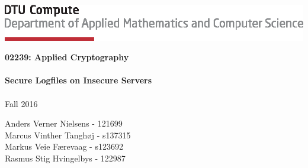 \begin{titlepage}
\null
\vfill
\includegraphics[scale=1]{img/tex_dtu_compute_a_uk}\\[20pt]
\addtolength{\wpXoffset}{-6cm}
\addtolength{\wpYoffset}{-10cm}

{\huge\bfseries 02239: Applied Cryptography}\\\ \\
{\LARGE\bfseries Secure Logfiles on Insecure Servers}\\\ \\
{Fall 2016}

\vspace{140pt}

Anders Verner Nielsens - 121699\\
Marcus Vinther Tanghøj - s137315\\
Markus Veie Færevaag - s123692\\
Rasmus Stig Hvingelbys - 122987 \\
\\
[7cm]
\end{titlepage}

\newpage